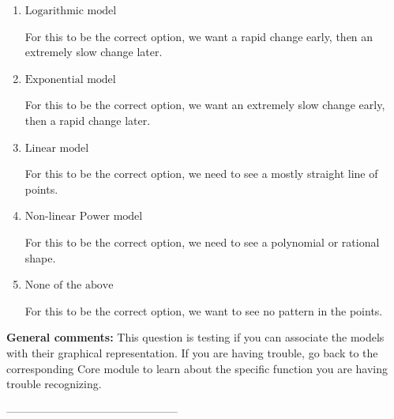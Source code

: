 \documentclass{extbook}[14pt]
\begin{document}
\begin{enumerate}[label=\Alph*.] 
\item $ \text{Logarithmic model} $ 

 For this to be the correct option, we want a rapid change early, then an extremely slow change later. 
\item $ \text{Exponential model} $ 

 For this to be the correct option, we want an extremely slow change early, then a rapid change later. 
\item $ \text{Linear model} $ 

 For this to be the correct option, we need to see a mostly straight line of points. 
\item $ \text{Non-linear Power model} $ 

 For this to be the correct option, we need to see a polynomial or rational shape. 
\item $ \text{None of the above} $ 

 For this to be the correct option, we want to see no pattern in the points. 
\end{enumerate} 
 
\textbf{General comments:} This question is testing if you can associate the models with their graphical representation. If you are having trouble, go back to the corresponding Core module to learn about the specific function you are having trouble recognizing.

-----------------------------------------------
\end{document}
